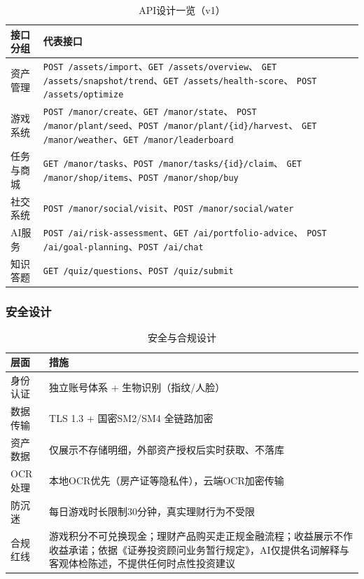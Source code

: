 \documentclass[12pt,a4paper]{ctexart}
\begin{document}
\begin{table}[htbp]
\centering
\begin{tabular}{p{4.5cm}p{8cm}}
\toprule
\textbf{接口分组} & \textbf{代表接口} \\
\midrule
资产管理 & \texttt{POST /assets/import}、\texttt{GET /assets/overview}、
\texttt{GET /assets/snapshot/trend}、\texttt{GET /assets/health-score}、
\texttt{POST /assets/optimize} \\
游戏系统 & \texttt{POST /manor/create}、\texttt{GET /manor/state}、
\texttt{POST /manor/plant/seed}、\texttt{POST /manor/plant/\{id\}/harvest}、
\texttt{GET /manor/weather}、\texttt{GET /manor/leaderboard} \\
任务与商城 & \texttt{GET /manor/tasks}、\texttt{POST /manor/tasks/\{id\}/claim}、
\texttt{GET /manor/shop/items}、\texttt{POST /manor/shop/buy} \\
社交系统 & \texttt{POST /manor/social/visit}、\texttt{POST /manor/social/water} \\
AI服务 & \texttt{POST /ai/risk-assessment}、\texttt{GET /ai/portfolio-advice}、
\texttt{POST /ai/goal-planning}、\texttt{POST /ai/chat} \\
知识答题 & \texttt{GET /quiz/questions}、\texttt{POST /quiz/submit} \\
\bottomrule
\end{tabular}
\caption{API设计一览（v1）}
\end{table}

\subsubsection{安全设计}
\begin{table}[htbp]
\centering
\begin{tabular}{p{3cm}p{9.5cm}}
\toprule
\textbf{层面} & \textbf{措施} \\
\midrule
身份认证 & 独立账号体系 + 生物识别（指纹/人脸） \\
数据传输 & TLS 1.3 + 国密SM2/SM4 全链路加密 \\
资产数据 & 仅展示不存储明细，外部资产授权后实时获取、不落库 \\
OCR处理 & 本地OCR优先（房产证等隐私件），云端OCR加密传输 \\
防沉迷 & 每日游戏时长限制30分钟，真实理财行为不受限 \\
合规红线 & 游戏积分不可兑换现金；理财产品购买走正规金融流程；收益展示不作收益承诺；依据《证券投资顾问业务暂行规定》，AI仅提供名词解释与客观体检陈述，不提供任何时点性投资建议 \\
\bottomrule
\end{tabular}
\caption{安全与合规设计}
\end{table}
\end{document}
